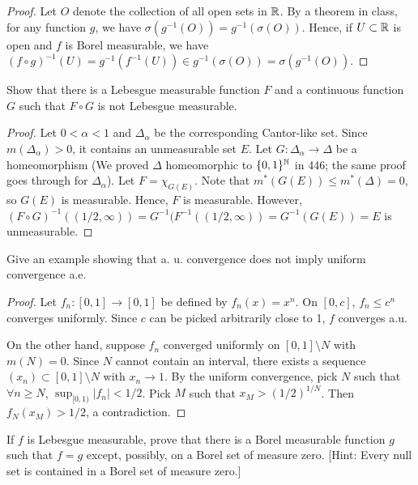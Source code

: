 \documentclass{article}
\begin{document}
\begin{proof}
Let $O$ denote the collection of all open sets in $\mathbb{R}$. By a theorem in class,  for any function $g$, we have $\sigma(g^{-1}(O)) = g^{-1}(\sigma(O))$.  Hence, if $U \subset \mathbb{R}$ is open  and $f$ is Borel measurable, we have
$(f\circ g)^{-1}(U) = g^{-1}(f^{-1}(U)) \in g^{-1}(\sigma(O)) = \sigma(g^{-1}(O))$.
\end{proof}
 Show that there is a Lebesgue measurable function $F$ and a continuous function $G$ such that $F \circ G$ is not Lebesgue measurable.
\begin{proof}
Let $0<\alpha<1$ and $\Delta_\alpha$ be the corresponding Cantor-like set.  Since $m(\Delta_\alpha) > 0$, it contains an unmeasurable set $E$.  Let $G:\Delta_\alpha \to \Delta$ be a homeomorphism (We proved $\Delta$ homeomorphic to $\{0,1\}^{\mathbb{N}}$ in 446; the same proof goes through for $\Delta_\alpha$). Let $F = \chi_{G(E)}$.
Note that $m^*(G(E)) \le m^*(\Delta) = 0$, so $G(E)$ is measurable. Hence, $F$ is measurable.  However, $(F\circ G)^{-1}((1/2, \infty)) = G^{-1}(F^{-1}((1/2,\infty)) = G^{-1}(G(E)) = E$ is unmeasurable.
\end{proof}
 Give an example showing that a. u. convergence does not imply uniform convergence a.e.
\begin{proof}
Let $f_n:[0,1] \to [0,1]$ be defined by $f_n(x) = x^n$. On $[0,c]$, $f_n \le c^n$ converges uniformly.  Since $c$ can be picked arbitrarily close to 1, $f$ converges a.u.  

On the other hand, suppose $f_n$ converged uniformly on $[0,1] \setminus N$ with $m(N) = 0$. Since $N$ cannot contain an interval, there exists a sequence $(x_n) \subset [0,1] \setminus N$ with $x_n \to 1$.  By the uniform convergence, pick $N$ such that $\forall n \ge N$, $\sup_{[0,1)}|f_n| < 1/2$.  Pick $M$ such that $x_M > (1/2)^{1/N}$. Then $f_N(x_M) > 1/2$, a contradiction.
\end{proof}
 If $f$ is Lebesgue measurable, prove that there is a Borel measurable function $g$ such that $f = g$ except, possibly, on a Borel set of measure zero. [Hint: Every null set is contained in a Borel set of measure zero.]
\end{document}
